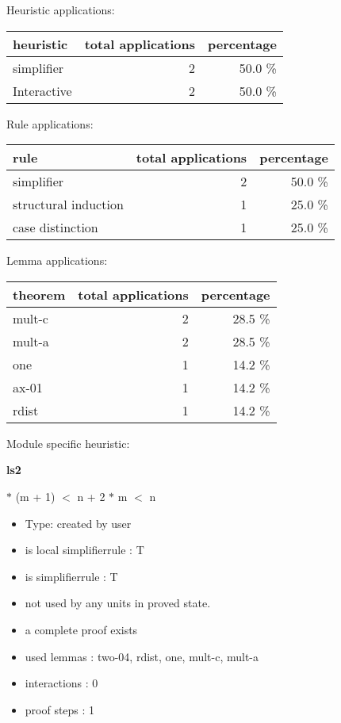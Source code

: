 \documentclass[a4paper]{article}
\begin{document}
\medskip


Heuristic applications:

\begin{supertabular}{l|r|r}
heuristic	& total applications & percentage \\ \hline
simplifier & 2 & 50.0 \% \\
Interactive & 2 & 50.0 \% \\

\end{supertabular}

Rule applications:

\begin{supertabular}{l|r|r}
rule	        & total applications & percentage \\ \hline
simplifier & 2 & 50.0 \% \\
structural induction & 1 & 25.0 \% \\
case distinction & 1 & 25.0 \% \\

\end{supertabular}

Lemma applications:

\begin{supertabular}{l|r|r}
theorem	        & total applications & percentage \\ \hline
mult-c & 2 & 28.5 \% \\
mult-a & 2 & 28.5 \% \\
one & 1 & 14.2 \% \\
ax-01 & 1 & 14.2 \% \\
rdist & 1 & 14.2 \% \\

\end{supertabular}

Module specific heuristic:

\pagebreak

{\LARGE\bf ls2}\label{lemma-ls2}

\medskip

  $*$ (m + 1) $<$ n + 2  $*$ m $<$ n

\begin{itemize}

\item Type: created by user

\item is local simplifierrule : T
\item is simplifierrule : T
\item not used by any units in proved state.
\item       a complete proof exists
\item       used lemmas  : two-04, rdist, one, mult-c, mult-a
\item       interactions : 0
\item       proof steps  : 1
\end{itemize}
\end{document}
